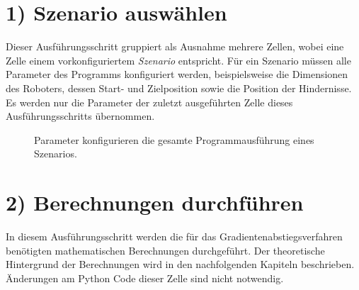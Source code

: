 \section*{1) Szenario auswählen}
\enlargethispage{1.5cm}
Dieser Ausführungsschritt gruppiert als Ausnahme mehrere Zellen, wobei eine Zelle einem vorkonfiguriertem \textit{Szenario} entspricht. Für ein Szenario müssen alle Parameter des Programms konfiguriert werden, beispielsweise die Dimensionen des Roboters, dessen Start- und Zielposition sowie die Position der Hindernisse. Es werden nur die Parameter der zuletzt ausgeführten Zelle dieses Ausführungsschritts übernommen.
\begin{figure}[H]
	\centering
	\footnotesize
	\centerline{}
	\vspace*{-0.2cm}
	\caption{Parameter konfigurieren die gesamte Programmausführung eines Szenarios.}
\end{figure}

\section*{2) Berechnungen durchführen}
In diesem Ausführungsschritt werden die für das Gradientenabstiegsverfahren benötigten mathematischen Berechnungen durchgeführt. Der theoretische Hintergrund der Berechnungen wird in den nachfolgenden Kapiteln beschrieben. Änderungen am Python Code dieser Zelle sind nicht notwendig.

